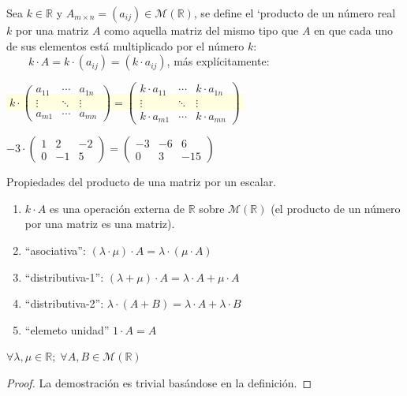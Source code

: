 \begin{defi}
Sea $k\in \mathbb R$ y $A_{m\times n}=(a_{ij}) \in \mathcal M (\mathbb R)$, se define el `producto de un número real $k$ por una matriz $A$ como aquella matriz del mismo tipo que $A$ en que cada uno de sus elementos está multiplicado por el número $k$:
$\qquad k \cdot A= k\cdot (a_{ij})= (k\cdot a_{ij})$, más explícitamente:

\vspace{2mm} \hspace{1cm} \colorbox{LightYellow}{$\boxed{\; k \cdot \left( \begin{matrix} a_{11} & \cdots & a_{1n} \\
\vdots & \ddots & \vdots \\ a_{m1} & \cdots & a_{mn}     \end{matrix}\right)	 = \left( \begin{matrix} k\cdot a_{11} & \cdots & k\cdot a_{1n} \\
\vdots & \ddots & \vdots \\ k\cdot a_{m1} & \cdots & k\cdot a_{mn}     \end{matrix}\right)\; }$}
\end{defi}

\begin{ejem}
$-3 \cdot \left( \begin{matrix} 1&2&-2 \\0&-1&5  \end{matrix}\right)= \left( \begin{matrix} -3&-6&6\\0&3&-15  \end{matrix}\right)$	
\end{ejem}
\begin{prop}{Propiedades del producto de una matriz por un escalar}.

\begin{enumerate}
\item $k\cdot A$ es una operación externa de $\mathbb R$ sobre $\mathcal M(\mathbb R)$ (el producto de un número por una matriz es una matriz).
\item ``asociativa'': $(\lambda \cdot \mu)\cdot A= \lambda\cdot (\mu \cdot A)$
\item ``distributiva-1'': $(\lambda+\mu)\cdot A= \lambda \cdot A + \mu \cdot A$
\item ``distributiva-2'': $\lambda \cdot (A+B)= \lambda \cdot A + \lambda \cdot B$
\item ``elemeto unidad'' $1\cdot A = A$	
\end{enumerate}
\hspace{1cm}$\forall \lambda, \mu \in \mathbb R; \; \forall A,B \in \mathcal M(\mathbb R)$
	
\end{prop}
\begin{proof}
La demostración es trivial basándose en la definición.	
\end{proof}



